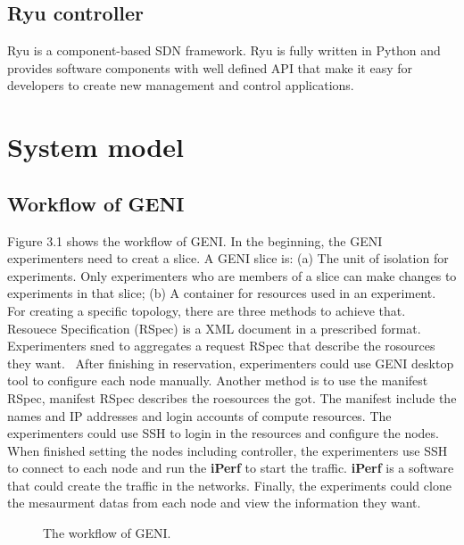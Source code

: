 \documentclass[a4paper,12pt]{report}
\begin{document}
\begin{large}
     \section{Ryu controller}
     \qquad Ryu is a component-based SDN framework. Ryu is fully written in Python and provides software components with well defined API that make it easy for developers to create new management and control applications. 
     \chapter{System model}
     \section{Workflow of GENI}
     \qquad Figure 3.1 shows the workflow of GENI. In the beginning, the GENI experimenters need to creat a slice. A GENI slice is: (a) The unit of isolation for experiments. Only experimenters who are members of a slice can make changes to experiments in that slice; (b) A container for resources used in an experiment.
     \newline
     \null\qquad For creating a specific topology, there are three methods to achieve that. Resouece Specification (RSpec) is a XML document in a prescribed format. Experimenters sned to  aggregates a request RSpec that describe the rosources they want.\
     \newline
     \null\qquad After finishing in reservation, experimenters could use GENI desktop tool to configure each node manually. Another method is to use the manifest RSpec, manifest RSpec describes the roesources the got. The manifest include the names and IP addresses and login accounts of compute resources. The experimenters could use SSH to login in the resources and configure the nodes.
     \newline
     \null\qquad When finished setting the nodes including controller, the experimenters use SSH to connect to each node and run the {\bf iPerf} to start the traffic. {\bf iPerf} is a software that could create the traffic in the networks.
     \newline
     \null\qquad Finally, the experiments could clone the mesaurment datas from each node and view the information they want.
       \begin{figure}
          \caption{The workflow of GENI.}
          \centering

\end{figure}
\end{large}
\end{document}
